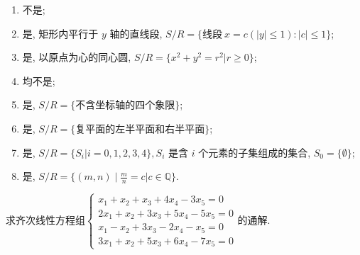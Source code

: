 \begin{exercise}
\begin{exgroup}
        \begin{answer}
            \begin{enumerate}
                \item 不是;
                \item 是, 矩形内平行于 $y$ 轴的直线段, $S/R = \{ \text{线段} \ x = c (|y| \leq 1) : |c| \leq 1 \} $;
                \item 是, 以原点为心的同心圆, $S/R = \{ x^2 + y^2 = r^2 | r \geq 0 \} $;
                \item 均不是;
                \item 是, $S/R = \{ \text{不含坐标轴的四个象限} \} $;
                \item 是, $S/R = \{ \text{复平面的左半平面和右半平面} \} $;
                \item 是, $S/R = \{ S_i | i = 0, 1, 2, 3, 4 \}, S_i $ 是含 $i$ 个元素的子集组成的集合, $S_0 = \{ \emptyset \}$;
                \item 是, $S/R = \{ (m,n) \mid \frac{m}{n} = c | c \in \mathbb{Q} \}$.
            \end{enumerate}
        \end{answer}

        \item 求齐次线性方程组$\begin{cases}
                x_1+x_2+x_3+4x_4-3x_5=0   \\
                2x_1+x_2+3x_3+5x_4-5x_5=0 \\
                x_1-x_2+3x_3-2x_4-x_5=0   \\
                3x_1+x_2+5x_3+6x_4-7x_5=0
            \end{cases}$的通解.


\end{exgroup}
\end{exercise}
